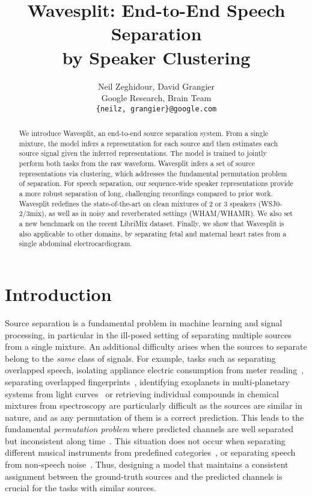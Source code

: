 \documentclass[letterpaper, onecolumn,10 pt]{IEEEtran}
\title{Wavesplit: End-to-End Speech Separation\\ by Speaker Clustering}
\author{Neil Zeghidour, David Grangier \\
  Google Research, Brain Team\\
  \texttt{\{neilz, grangier\}@google.com} \\
  }
\begin{document}
\maketitle

\begin{abstract}
\normalsize{We introduce Wavesplit, an end-to-end source separation system. From a single mixture, the model infers a representation for each source and then estimates each source signal given the inferred representations. The model is trained to jointly perform both tasks from the raw waveform. Wavesplit infers a set of source representations via clustering, which addresses the fundamental permutation problem of separation. For speech separation, our sequence-wide speaker representations provide a more robust separation of long, challenging recordings compared to prior work. Wavesplit redefines the state-of-the-art on clean mixtures of 2 or 3 speakers (WSJ0-2/3mix), as well as in noisy and reverberated settings (WHAM/WHAMR). We also set a new benchmark on the recent LibriMix dataset. Finally, we show that Wavesplit is also applicable to other domains, by separating fetal and maternal heart rates from a single abdominal electrocardiogram.}
\end{abstract}

\section{Introduction}
\label{sec:intro}

Source separation is a fundamental problem in machine learning and signal processing, in particular in the ill-posed setting of separating multiple sources from a single mixture. An additional difficulty arises when the sources to separate belong to the {\it same} class of signals. For example, tasks such as separating overlapped speech, isolating appliance electric consumption from meter reading~\cite{murray2017electrical}, separating overlapped fingerprints~\cite{shehu2018sokoto}, identifying exoplanets in multi-planetary systems from light curves~\cite{shallue2018identifying} or retrieving individual compounds in chemical mixtures from spectroscopy \cite{toumi2014review} are particularly difficult as the sources are similar in nature, and as any permutation of them is a correct prediction. This leads to the fundamental {\it permutation problem} where predicted channels are well separated but inconsistent along time~\cite{weng15:energy}. This situation does not occur when separating different musical instruments from predefined categories~\cite{musdb18}, or separating speech from non-speech noise~\cite{loizou2013speech}. Thus, designing a model that maintains a consistent assignment between the ground-truth sources and the predicted channels is crucial for the tasks with similar sources.
\end{document}
